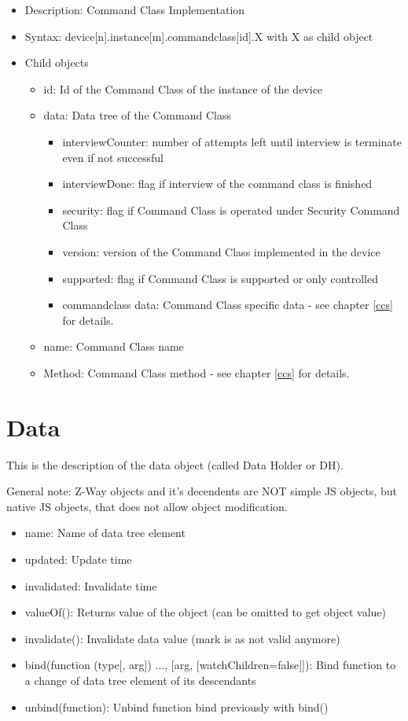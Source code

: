 \begin {itemize}
\item Description: Command Class Implementation
\item Syntax:  device[n].instance[m].commandclass[id].X with  X as child object
\item Child objects
\begin {itemize}
\item id: Id of the Command Class of the instance of the device
\item data: Data tree of the Command Class
\begin {itemize}
\item interviewCounter: number of attempts left until interview is terminate even if not successful
\item interviewDone: flag if interview of the command class is finished
\item security: flag if Command Class is operated under Security Command Class
\item version: version of the Command Class implemented in the device
\item supported: flag if Command Class is supported or only controlled
\item {commandclass data}: Command Class specific data - see chapter \ref{ccs} for details.
\end {itemize}
\item name: Command Class name
\item {Method}: Command Class method - see chapter \ref{ccs} for details.
\end {itemize}
\end {itemize}

\section{Data}

This is the description of the data object (called Data Holder or DH).

General note: Z-Way objects and it's decendents are NOT simple JS objects, but native JS objects, that does not allow object modification.

\begin {itemize}
\item name: Name of data tree element
\item updated: Update time
\item invalidated: Invalidate time
\item valueOf(): Returns value of the object (can be omitted to get object value)
\item invalidate(): Invalidate data value (mark is as not valid anymore)
\item bind(function (type[, arg]) {...}, [arg, [watchChildren=false]]): Bind function to a change of data tree element of its descendants
\item unbind(function): Unbind function bind previously with bind()
\end {itemize}

 
